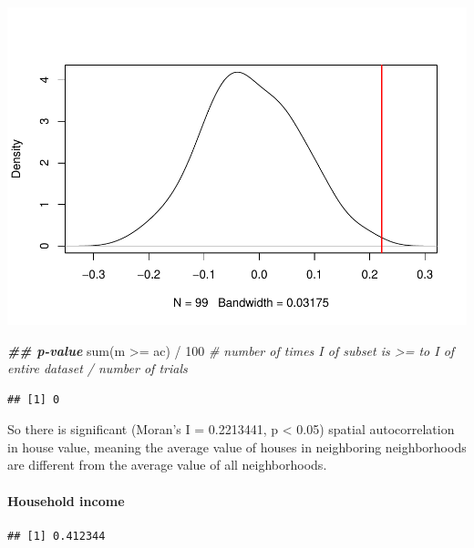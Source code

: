 \documentclass[
]{article}
\newenvironment{Shaded}{\begin{snugshade}}{\end{snugshade}}
\newcommand{\CommentTok}[1]{\textcolor[rgb]{0.56,0.35,0.01}{\textit{#1}}}
\newcommand{\ControlFlowTok}[1]{\textcolor[rgb]{0.13,0.29,0.53}{\textbf{#1}}}
\newcommand{\DecValTok}[1]{\textcolor[rgb]{0.00,0.00,0.81}{#1}}
\newcommand{\DocumentationTok}[1]{\textcolor[rgb]{0.56,0.35,0.01}{\textbf{\textit{#1}}}}
\newcommand{\FunctionTok}[1]{\textcolor[rgb]{0.00,0.00,0.00}{#1}}
\newcommand{\NormalTok}[1]{#1}
\newcommand{\OtherTok}[1]{\textcolor[rgb]{0.56,0.35,0.01}{#1}}
\newcommand{\SpecialCharTok}[1]{\textcolor[rgb]{0.00,0.00,0.00}{#1}}
\newcommand{\StringTok}[1]{\textcolor[rgb]{0.31,0.60,0.02}{#1}}
\begin{document}
\includegraphics[width=0.5\linewidth]{midterm-project_files/figure-latex/unnamed-chunk-9-1}

\begin{Shaded}
\begin{Highlighting}[]
\DocumentationTok{\#\# p{-}value}
\FunctionTok{sum}\NormalTok{(m }\SpecialCharTok{\textgreater{}=}\NormalTok{ ac) }\SpecialCharTok{/} \DecValTok{100} \CommentTok{\# number of times I of subset is \textgreater{}= to I of entire dataset / number of trials}
\end{Highlighting}
\end{Shaded}

\begin{verbatim}
## [1] 0
\end{verbatim}

So there is significant (Moran's I = 0.2213441, p \textless{} 0.05)
spatial autocorrelation in house value, meaning the average value of
houses in neighboring neighborhoods are different from the average value
of all neighborhoods.

\hypertarget{household-income}{%
\paragraph{Household income}\label{household-income}}

\begin{Shaded}
\end{Shaded}

\begin{verbatim}
## [1] 0.412344
\end{verbatim}

\begin{Shaded}
\end{Shaded}
\end{document}
